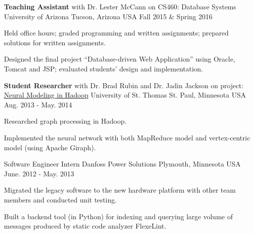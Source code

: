 \begin{cventries}
  \cventry
    {\textbf{Teaching Assistant} with Dr. Lester McCann
    on CS460: Database Systems}
    {University of Arizona} %
    {Tucson, Arizona USA} %
    {Fall 2015 \& Spring 2016} %
    {
      \begin{cvitems} %
        \item {Held office hours; graded programming and written
    assignments; prepared solutions for written assignments.}
        \item {Designed the final project ``Database-driven Web
    Application'' using Oracle, Tomcat and JSP; evaluated
    students' design and implementation.}
      \end{cvitems}
    }

  \cventry
    {\textbf{Student Researcher} with Dr. Brad Rubin and Dr. Jadin
    Jackson on project: \href{http://imsure.github.io/NeuralGiraph/}{Neural
    Modeling in Hadoop}}
    {University of St. Thomas} %
    {St. Paul, Minnesota USA} %
    {Aug. 2013 - May. 2014} %
    {
      \begin{cvitems} %
      \item {Researched graph processing in Hadoop.}
      \item {Implemented the neural network with both MapReduce model
    and vertex-centric model (using Apache Giraph).}
      \end{cvitems}
    }

  \cventry
    {Software Engineer Intern} %
    {Danfoss Power Solutions} %
    {Plymouth, Minnesota USA} %
    {June. 2012 - May. 2013} %
    {
      \begin{cvitems} %
        \item {Migrated the legacy software to the new hardware
    platform with other team members and conducted unit testing.}
       \item {Built a backend tool (in Python) for indexing and
    querying large volume of messages produced by static code analyzer FlexeLint.}
      \end{cvitems}
    }


\end{cventries}
